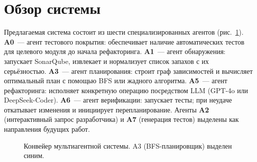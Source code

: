 \documentclass[conference]{IEEEtran}
\begin{document}
\section{Обзор системы}

Предлагаемая система состоит из шести специализированных агентов
(рис.~\ref{fig:pipeline}).
\textbf{A0}~--- агент тестового покрытия: обеспечивает наличие
автоматических тестов для целевого модуля до начала рефакторинга.
\textbf{A1}~--- агент обнаружения: запускает SonarQube, извлекает и
нормализует список запахов с их серьёзностью.
\textbf{A3}~--- агент планирования: строит граф зависимостей и вычисляет
оптимальный план с помощью BFS или жадного алгоритма.
\textbf{A5}~--- агент рефакторинга: исполняет конкретную операцию
посредством LLM (GPT-4o или DeepSeek-Coder).
\textbf{A6}~--- агент верификации: запускает тесты; при неудаче
откатывает изменения и инициирует перепланирование.
Агенты \textbf{A2} (интерактивный запрос разработчика) и
\textbf{A7} (генерация тестов) выделены как направления будущих работ.

\begin{figure}[tb]
\centering
{}
\caption{Конвейер мультиагентной системы. A3 (BFS-планировщик) выделен синим.}
\label{fig:pipeline}
\end{figure}
\end{document}
